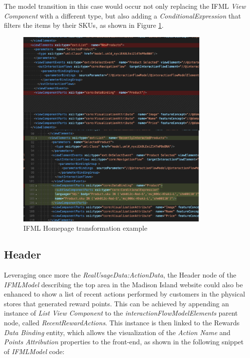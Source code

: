 The model transition in this case would occur not only replacing the IFML \textit{View Component} with a different type, but also adding a \textit{ConditionalExpression} that filters the items by their SKUs, as shown in Figure \ref{fig:ifml-transformation-example}.

\vspace{0.5cm}
\begin{figure}[H]
  \centering
    \includegraphics[height=10cm]{images/madison/ifm-homepage-transformation.png}
  \caption{IFML Homepage transformation example}
  \label{fig:ifml-transformation-example}
\end{figure}
\vspace{0.5cm}

\subsection{Header}
\label{header-updates}

Leveraging once more the \textit{RealUsageData:ActionData}, the Header node of the \textit{IFMLModel} describing the top area in the Madison Island website could also be enhanced to show a list of recent actions performed by customers in the physical stores that generated reward points.  This can be achieved by appending an instance of \textit{List View Component} to the \textit{interactionFlowModelElements} parent node, called \textit{RecentRewardActions}. This instance is then linked to the Rewards \textit{Data Binding} entity, which allows the visualization of the \textit{Action Name} and \textit{Points Attribution} properties to the front-end, as shown in the following snippet of \textit{IFMLModel} code:

